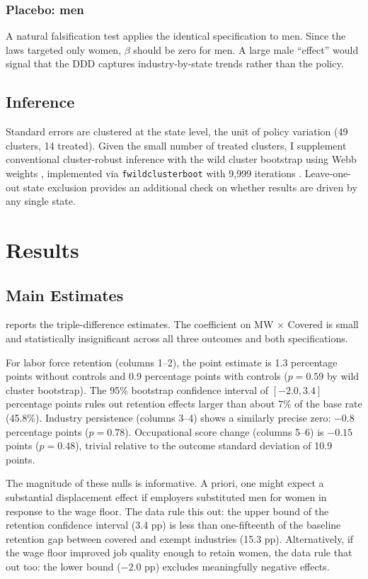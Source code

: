 \documentclass[12pt]{article}
\begin{document}
\subsubsection*{Placebo: men} A natural falsification test applies the identical specification to men. Since the laws targeted only women, $\beta$ should be zero for men. A large male ``effect'' would signal that the DDD captures industry-by-state trends rather than the policy.

\subsection{Inference}

Standard errors are clustered at the state level, the unit of policy variation (49 clusters, 14 treated). Given the small number of treated clusters, I supplement conventional cluster-robust inference with the wild cluster bootstrap using Webb weights \citep{webb2014reworking}, implemented via \texttt{fwildclusterboot} with 9,999 iterations \citep{roodman2019fast}. Leave-one-out state exclusion provides an additional check on whether results are driven by any single state.

\section{Results}
\label{sec:results}

\subsection{Main Estimates}

 reports the triple-difference estimates. The coefficient on MW $\times$ Covered is small and statistically insignificant across all three outcomes and both specifications.

For labor force retention (columns 1--2), the point estimate is 1.3 percentage points without controls and 0.9 percentage points with controls ($p = 0.59$ by wild cluster bootstrap). The 95\% bootstrap confidence interval of $[-2.0, 3.4]$ percentage points rules out retention effects larger than about 7\% of the base rate (45.8\%). Industry persistence (columns 3--4) shows a similarly precise zero: $-0.8$ percentage points ($p = 0.78$). Occupational score change (columns 5--6) is $-0.15$ points ($p = 0.48$), trivial relative to the outcome standard deviation of 10.9 points.

The magnitude of these nulls is informative. A priori, one might expect a substantial displacement effect if employers substituted men for women in response to the wage floor. The data rule this out: the upper bound of the retention confidence interval (3.4 pp) is less than one-fifteenth of the baseline retention gap between covered and exempt industries (15.3 pp). Alternatively, if the wage floor improved job quality enough to retain women, the data rule that out too: the lower bound ($-2.0$ pp) excludes meaningfully negative effects.
\end{document}
